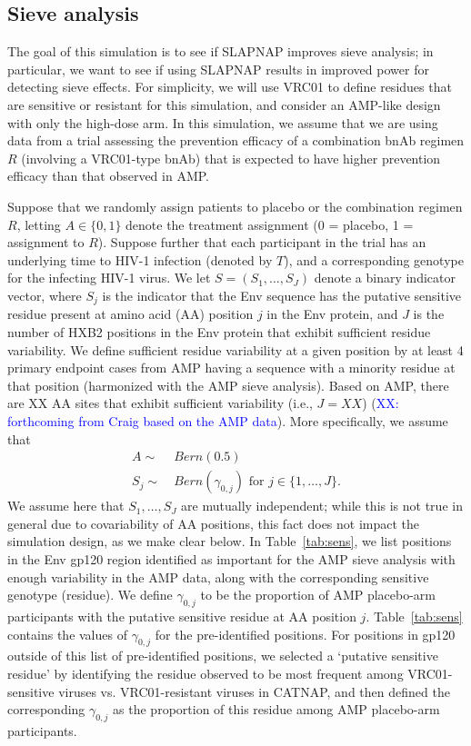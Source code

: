 \documentclass[10pt]{article}
\begin{document}
\subsection{Sieve analysis}

The goal of this simulation is to see if SLAPNAP improves sieve analysis; in particular, we want to see if using SLAPNAP results in improved power for detecting sieve effects. For simplicity, we will use VRC01 to define residues that are sensitive or resistant for this simulation, and consider an AMP-like design with only the high-dose arm. In this simulation, we assume that we are using data from a trial assessing the prevention efficacy of a combination bnAb regimen $R$ (involving a VRC01-type bnAb) that is expected to have higher prevention efficacy than that observed in AMP.

Suppose that we randomly assign patients to placebo or the combination regimen $R$, letting $A \in \{0,1\}$ denote the treatment assignment (0 = placebo, 1 = assignment to $R$). Suppose further that each participant in the trial has an underlying time to HIV-1 infection (denoted by $T$), and a corresponding genotype for the infecting HIV-1 virus. We let $S = (S_1, \ldots, S_J)$ denote a binary indicator vector, where $S_j$ is the indicator that the Env sequence has the putative sensitive residue present at amino acid (AA) position $j$ in the Env protein, and $J$ is the number of HXB2 positions in the Env protein that exhibit sufficient residue variability. We define sufficient residue variability at a given position by at least 4 primary endpoint cases from AMP having a sequence with a minority residue at that position (harmonized with the AMP sieve analysis). Based on AMP, there are XX AA sites that exhibit sufficient variability (i.e., $J = XX$) (\textcolor{blue}{XX: forthcoming from Craig based on the AMP data}). More specifically, we assume that
\begin{align*}
  A \sim & \ Bern(0.5) \\
  S_j \sim & \ Bern(\gamma_{0,j}) \text{ for } j \in \{1, \ldots, J\}.
\end{align*}
We assume here that $S_1, \ldots, S_J$ are mutually independent; while this is not true in general due to covariability of AA positions, this fact does not impact the simulation design, as we make clear below. In Table~\ref{tab:sens}, we list positions in the Env gp120 region identified as important for the AMP sieve analysis with enough variability in the AMP data, along with the corresponding sensitive genotype (residue). We define $\gamma_{0,j}$ to be the proportion of AMP placebo-arm participants with the putative sensitive residue at AA position $j$. Table~\ref{tab:sens} contains the values of $\gamma_{0,j}$ for the pre-identified positions. For positions in gp120 outside of this list of pre-identified positions, we selected a `putative sensitive residue' by identifying the residue observed to be most frequent among VRC01-sensitive viruses vs. VRC01-resistant viruses in CATNAP, and then defined the corresponding $\gamma_{0,j}$ as the proportion of this residue among AMP placebo-arm participants.
\end{document}
